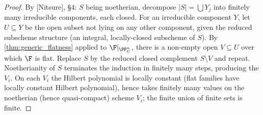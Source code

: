 \begin{proof}
  
  By [Nitsure], \S4: \(S\) being noetherian, decompose \(|S| = \bigcup Y_j\) into
  finitely many irreducible components, each closed.  For an irreducible
  component \(Y\), let \(U \subseteq Y\) be the open subset not lying on any other
  component, given the reduced subscheme structure (an integral, locally-closed
  subscheme of \(S\)).  By \cref{thm:generic_flatness} applied to
  \(\F|_{\PP^n_U}\), there is a non-empty open \(V \subseteq U\) over which \(\F\) is
  flat.  Replace \(S\) by the reduced closed complement \(S \setminus V\) and
  repeat. Noetherianity of \(S\) terminates the induction in finitely many
  steps, producing the \(V_i\).  On each \(V_i\) the Hilbert polynomial is locally
  constant (flat families have locally constant Hilbert polynomial), hence
  takes finitely many values on the noetherian (hence quasi-compact) scheme
  \(V_i\); the finite union of finite sets is finite.
\end{proof}

